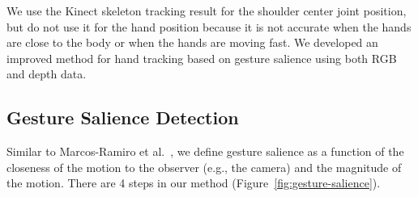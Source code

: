 \documentclass{acm_proc_article-sp}
\begin{document}
We use the Kinect skeleton tracking result for the shoulder center joint position,
but do not use it for the hand position because
it is not accurate when the hands are close to the body or when the hands are moving fast.
We developed an improved method for hand tracking based on gesture salience using both
RGB and depth data.

\subsection{Gesture Salience Detection}
Similar to Marcos-Ramiro et al.~\cite{marcos2013}, we define gesture salience as a function of 
the closeness of the motion to the observer (e.g., the camera) and the magnitude of the motion.
There are 4 steps in our method (Figure~\ref{fig:gesture-salience}). 
\end{document}
